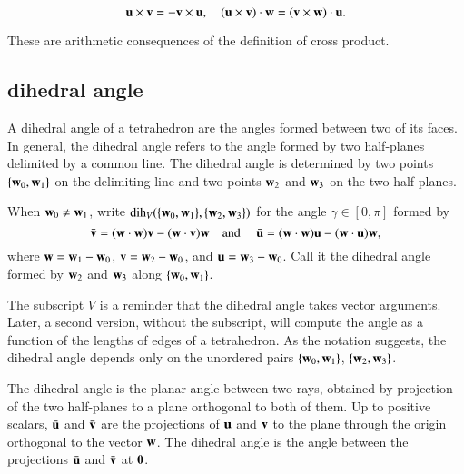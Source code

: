 \begin{lemma}
    \begin{displaymath}
    {\mathbf u}\times {\mathbf v} = -{\mathbf v}\times {\mathbf u},\quad
    ({\mathbf u}\times {\mathbf v})\cdot {\mathbf w} = ({\mathbf v}\times {\mathbf w})\cdot {\mathbf u}.
    \end{displaymath}
\end{lemma}

\begin{proved}
These are arithmetic consequences of the definition of cross product.
\swallowed\end{proved}



\subsection{dihedral angle}

A dihedral angle of a tetrahedron are the angles formed between two of its faces. In general,
the dihedral angle refers to the angle formed by two half-planes
delimited by a common line.  The dihedral angle is determined
by two points $\{{\mathbf w}_0,{\mathbf w}_1\}$ on the delimiting line
and two points ${\mathbf w}_2$ and ${\mathbf w}_3$ on the two half-planes.
%
%
%
%
%

\begin{definition}\label{def:dih} When ${\mathbf w}_0\ne {\mathbf w}_1$,
write $\operatorname{dih}_V(\{{\mathbf w}_0,{\mathbf w}_1\},\{{\mathbf w}_2,{\mathbf w}_3\})$ for the angle $\gamma\in[0,\pi]$
formed
by 
    \begin{displaymath}
    \bar {{\mathbf v}} = ({\mathbf w}\cdot {\mathbf w}) {\mathbf v} - ({\mathbf w}\cdot {\mathbf v}) {\mathbf w}\quad\text{and }\quad \bar {{\mathbf u}} =
            ({\mathbf w}\cdot {\mathbf w}) {\mathbf u} - ({\mathbf w}\cdot {\mathbf u}) {\mathbf w},
    \end{displaymath}
where ${\mathbf w}={\mathbf w}_1-{\mathbf w}_0$, ${\mathbf v} = {\mathbf w}_2-{\mathbf w}_0$,  and ${\mathbf u}={\mathbf w}_3-{\mathbf w}_0$.  Call it
the dihedral angle formed by ${\mathbf w}_2$ and ${\mathbf w}_3$ along $\{{\mathbf w}_0,{\mathbf w}_1\}$.
%
%
\end{definition}
The subscript $V$ is a reminder 
that the dihedral angle takes vector arguments.
Later, a second version, without the subscript, will
compute the angle as a function of the lengths of edges of a 
tetrahedron.
%
%
As the notation suggests, the dihedral angle depends only
on the unordered pairs $\{{\mathbf w}_0,{\mathbf w}_1\}$, $\{{\mathbf w}_2,{\mathbf w}_3\}$.

The dihedral angle is the planar angle between two rays, obtained by projection of the two half-planes to a plane orthogonal to both of them.
Up to positive scalars, $\bar {{\mathbf u}}$ and $\bar {{\mathbf v}}$ are the projections of
${\mathbf u}$ and ${\mathbf v}$ to the plane through the origin orthogonal to the vector ${\mathbf w}$.  The
dihedral angle is the angle between the projections
$\bar {{\mathbf u}}$ and $\bar {{\mathbf v}}$ at ${\mathbf 0}$.

